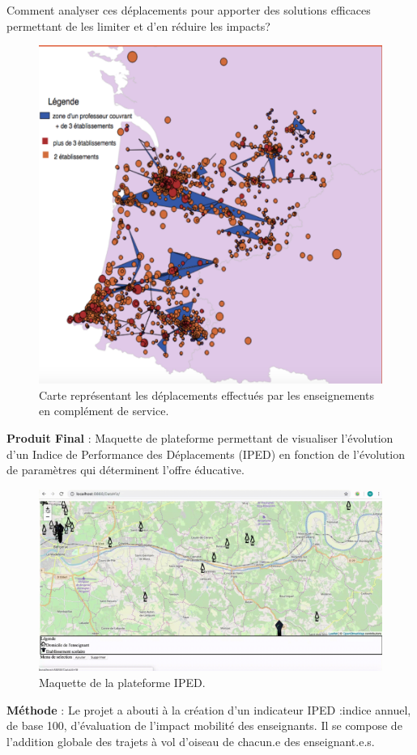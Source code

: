 \documentclass[]{book}
\begin{document}
Comment analyser ces déplacements pour apporter des solutions efficaces
permettant de les limiter et d'en réduire les impacts?

\begin{figure}

{\centering \includegraphics[width=0.6\linewidth]{./img/iped} 

}

\caption{Carte représentant les déplacements effectués par les enseignements en complément de service.}\label{fig:unnamed-chunk-6}
\end{figure}

\textbf{Produit Final} : Maquette de plateforme permettant de visualiser
l'évolution d'un Indice de Performance des Déplacements (IPED) en
fonction de l'évolution de paramètres qui déterminent l'offre éducative.

\begin{figure}

{\centering \includegraphics[width=0.6\linewidth]{./img/iped2} 

}

\caption{Maquette de la plateforme IPED.}\label{fig:unnamed-chunk-7}
\end{figure}

\textbf{Méthode} : Le projet a abouti à la création d'un indicateur IPED
:indice annuel, de base 100, d'évaluation de l'impact mobilité des
enseignants. Il se compose de l'addition globale des trajets à vol
d'oiseau de chacun.e des enseignant.e.s.
\end{document}
